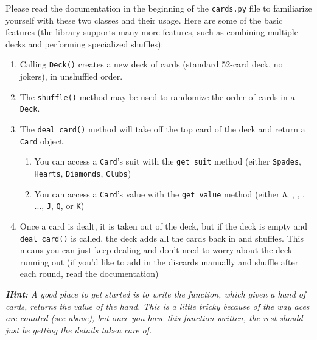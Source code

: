 \documentclass{hitec}
\begin{document}
Please read the documentation in the beginning of the \texttt{cards.py} file to familiarize yourself with these two classes and their usage. 
Here are some of the basic features (the library supports many more features, such as combining multiple decks and performing specialized shuffles):
\begin{enumerate}
	\item Calling \texttt{Deck()} creates a new deck of cards (standard 52-card deck, no jokers), in unshuffled order.
	\item The \texttt{shuffle()} method may be used to randomize the order of cards in a \texttt{Deck}.
	\item The \texttt{deal\_card()} method will take off the top card of the deck and return a \texttt{Card} object.
		\begin{enumerate}
		\item You can access a \texttt{Card}'s suit with the \texttt{get\_suit} method (either \texttt{\textquotesingle Spades\textquotesingle}, \texttt{\textquotesingle Hearts\textquotesingle}, \texttt{\textquotesingle Diamonds\textquotesingle}, \texttt{\textquotesingle Clubs\textquotesingle})
		\item You can access a \texttt{Card}'s value with the \texttt{get\_value} method (either \texttt{\textquotesingle A\textquotesingle}, \texttt{\textquotesingle}, \texttt{\textquotesingle}, \texttt{\textquotesingle}, ..., \texttt{\textquotesingle J\textquotesingle}, \texttt{\textquotesingle Q\textquotesingle}, or \texttt{\textquotesingle K\textquotesingle})
		\end{enumerate}
	\item Once a card is dealt, it is taken out of the deck, but if the deck is empty and \texttt{deal\_card()} is called, the deck adds all the cards back in and shuffles. This means you can just keep dealing and don't need to worry about the deck running out (if you'd like to add in the discards manually and shuffle after each round, read the documentation)
\end{enumerate}

\noindent\emph{\textbf{Hint:} A good place to get started is to write the function, which given a hand of cards, returns the value of the hand. This is a little tricky because of the way aces are counted (see above), but once you have this function written, the rest should just be getting the details taken care of.}
\end{document}
